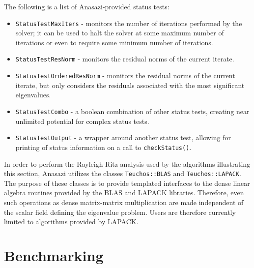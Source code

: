\documentclass[acmtoms]{acmtrans2m}
\newcounter{algorithm}
\newcommand{\aspace}[1]{\texttt{#1}}
\begin{document}
The following is a list of Anasazi-provided status tests:
\begin{itemize}
  \item \aspace{StatusTestMaxIters} - monitors the number of iterations
    performed by the solver; it can be used to halt the solver at some maximum number of iterations
    or even to require some minimum number of iterations.
  \item \aspace{StatusTestResNorm} - monitors the residual norms of the
    current iterate.
  \item \aspace{StatusTestOrderedResNorm} - monitors the residual
    norms of the current iterate, but only considers the residuals associated with the
    most significant eigenvalues.
  \item \aspace{StatusTestCombo} - a boolean combination of
    other status tests, creating near unlimited potential for complex status tests.
  \item \aspace{StatusTestOutput} - a wrapper around another
    status test, allowing for printing of status information on a call to
    \verb!checkStatus()!.
\end{itemize}


In order to perform the Rayleigh-Ritz analysis used by the
algorithms illustrating this section, Anasazi utilizes the classes
\aspace{Teuchos::BLAS} and \aspace{Teuchos::LAPACK}. The purpose of
these classes is to provide templated interfaces to the dense linear
algebra routines provided by the BLAS and LAPACK libraries.
Therefore, even such operations as dense matrix-matrix
multiplication are made independent of the scalar field defining the
eigenvalue problem. Users are therefore currently limited to
algorithms provided by LAPACK.

\section{Benchmarking}
\label{sec:benchmarking}
\end{document}
